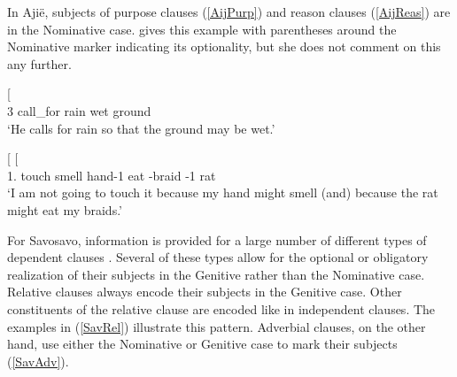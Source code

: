 In Aji\"e, subjects of purpose clauses (\ref{AijPurp}) and reason  clauses (\ref{AijReas}) are in the Nominative  case. 
 gives this example with parentheses around the Nominative marker indicating its optionality, but she does not comment on this any further.

\begin{exe}\ex\label{AijDep}
\begin{xlist}
\ex\label{AijPurp}\gll{}    {\rm[}   \textbf{} \textipa{ne\textbardotlessj 2\textglotstop}{\rm]}\\
3\sg{} call\_for rain \purp{} \Hyp{} wet \nom{} ground\\
\glt `He calls for rain so that the ground may be wet.' %

\ex\label{AijReas}\gll{}    {\rm[}   \textbf{} \textipa{kOwi-\textltailn}{\rm]}  {\rm[}     \textbf{} \textipa{yiipu}{\rm]}\\
1\sg{}.\prosp{} \Neg{} touch \reas{} \dubt{} smell \nom{} hand-1\sg{} \reas{} \dubt{} eat \coll{}-braid \poss{}-1\sg{} \nom{} rat\\
\glt `I am not going to touch it because my hand might smell (and) because the rat might eat my braids.'%
\end{xlist}
\end{exe}

For {Savosavo}, information is provided for a large number of different types of dependent clauses \citep[254--286]{Wegener:2008}.
Several of these types allow for the optional or obligatory  realization of their subjects in the Genitive rather than the Nominative case.
Relative clauses always encode their subjects in the Genitive case. 
Other constituents of the relative clause are encoded like in independent clauses. 
The examples in (\ref{SavRel}) illustrate this pattern.
Adverbial clauses, on the other hand, use either the Nominative  or Genitive case to mark their subjects (\ref{SavAdv}). 

